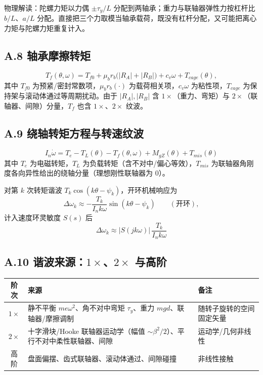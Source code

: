 \documentclass[11pt,a4paper]{article}
\theoremstyle{remark}\newtheorem{remark}{注}
\begin{document}
物理解读：陀螺力矩以力偶 $\pm\tau_y/L$ 分配到两轴承；重力与联轴器弹性力按杠杆比 $b/L$、$a/L$ 分配。直接把三个力取模当轴承载荷，既没有杠杆分配，又可能把离心力矩与陀螺力矩重复计入。

\subsection*{A.8 轴承摩擦转矩}

\begin{equation}
T_f(\theta,\omega)=T_{f0}+\mu_b r_b\bigl(|R_A|+|R_B|\bigr)+c_v\omega+T_{cage}(\theta),
\label{eq:app-Tf}
\end{equation}
其中 $T_{f0}$ 为预紧/密封常数项，$\mu_b r_b(\cdot)$ 为载荷相关项，$c_v\omega$ 为粘性项，$T_{cage}$ 为保持架与滚动体通过等周期扰动。由于 $|R_A|,|R_B|$ 含 $1\times$（重力、弯矩）与 $2\times$（联轴器、间隙）分量，$T_f$ 也含 $1\times$、$2\times$ 纹波。

\subsection*{A.9 绕轴转矩方程与转速纹波}

\begin{equation}
\boxed{\;I_n\dot\omega=T_e-T_L(\theta)-T_f(\theta,\omega)+M_{gZ}(\theta)+T_{mis}(\theta)\;}
\label{eq:app-torque}
\end{equation}
其中 $T_e$ 为电磁转矩，$T_L$ 为负载转矩（含不对中/偏心等效），$T_{mis}$ 为联轴器角刚度各向异性给出的绕轴分量（理想刚性联轴器为 $0$）。

对第 $k$ 次转矩谐波 $T_k\cos(k\theta-\psi_k)$，开环机械响应为
\begin{equation}
\Delta\omega_k\approx-\frac{T_k}{I_nk\omega}\sin(k\theta-\psi_k)\qquad(\text{开环}),
\end{equation}
计入速度环灵敏度 $S(s)$ 后
\begin{equation}
\boxed{\;\Delta\omega_k\approx|S(jk\omega)|\,\frac{T_k}{I_nk\omega}\;}
\label{eq:app-dw}
\end{equation}

\subsection*{A.10 谐波来源：$1\times$、$2\times$ 与高阶}

\begin{center}\footnotesize
\begin{tabular}{@{}cll@{}}
\toprule
阶次 & 来源 & 备注\\
\midrule
$1\times$ & 静不平衡 $me\omega^2$、角不对中弯矩 $\tau_y$、重力 $mgd$、联轴器/摩擦调制 & 随转子旋转的空间固定矢量\\
$2\times$ & 十字滑块/Hooke 联轴器运动学（幅值 $\sim\beta^2/2$）、平行不对中柔性联轴器、间隙 & 运动学/几何非线性\\
高阶 & 盘面偏摆、齿式联轴器、滚动体通过、间隙碰撞 & 非线性接触\\
\bottomrule
\end{tabular}
\end{center}
\end{document}

